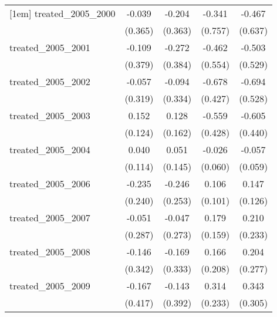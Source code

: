 {\begin{tabular}{l*{4}{c}}
[1em]
treated\_2005\_2000&      -0.039         &      -0.204         &      -0.341         &      -0.467         \\
            &     (0.365)         &     (0.363)         &     (0.757)         &     (0.637)         \\
[1em]
treated\_2005\_2001&      -0.109         &      -0.272         &      -0.462         &      -0.503         \\
            &     (0.379)         &     (0.384)         &     (0.554)         &     (0.529)         \\
[1em]
treated\_2005\_2002&      -0.057         &      -0.094         &      -0.678         &      -0.694         \\
            &     (0.319)         &     (0.334)         &     (0.427)         &     (0.528)         \\
[1em]
treated\_2005\_2003&       0.152         &       0.128         &      -0.559         &      -0.605         \\
            &     (0.124)         &     (0.162)         &     (0.428)         &     (0.440)         \\
[1em]
treated\_2005\_2004&       0.040         &       0.051         &      -0.026         &      -0.057         \\
            &     (0.114)         &     (0.145)         &     (0.060)         &     (0.059)         \\
[1em]
treated\_2005\_2006&      -0.235         &      -0.246         &       0.106         &       0.147         \\
            &     (0.240)         &     (0.253)         &     (0.101)         &     (0.126)         \\
[1em]
treated\_2005\_2007&      -0.051         &      -0.047         &       0.179         &       0.210         \\
            &     (0.287)         &     (0.273)         &     (0.159)         &     (0.233)         \\
[1em]
treated\_2005\_2008&      -0.146         &      -0.169         &       0.166         &       0.204         \\
            &     (0.342)         &     (0.333)         &     (0.208)         &     (0.277)         \\
[1em]
treated\_2005\_2009&      -0.167         &      -0.143         &       0.314         &       0.343         \\
            &     (0.417)         &     (0.392)         &     (0.233)         &     (0.305)         \\

\end{tabular}}
